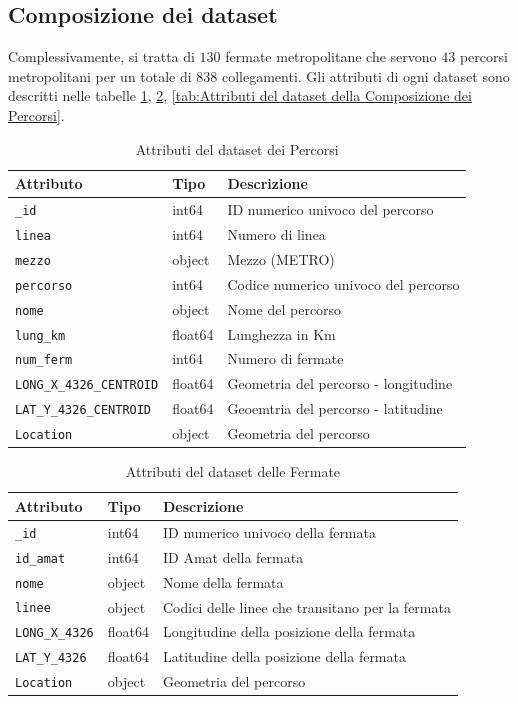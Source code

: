 \subsection{Composizione dei dataset}
Complessivamente, si tratta di $130$ fermate metropolitane che servono $43$ percorsi metropolitani per un totale di $838$ collegamenti. Gli attributi di ogni dataset sono descritti nelle tabelle \ref{tab:Attributi del dataset dei Percorsi}, \ref{tab:Attributi del dataset delle Fermate}, \ref{tab:Attributi del dataset della Composizione dei Percorsi}.

\begin{table}[!ht]
\centering
\begin{tabular}{lll}
\hline
\textbf{Attributo} & \textbf{Tipo} & \textbf{Descrizione} \\
\hline
\texttt{\_id} & int64 & ID numerico univoco del percorso \\
\texttt{linea} & int64 & Numero di linea \\
\texttt{mezzo} & object & Mezzo (METRO) \\
\texttt{percorso} & int64 & Codice numerico univoco del percorso \\
\texttt{nome} & object & Nome del percorso \\
\texttt{lung\_km} & float64 & Lunghezza in Km \\
\texttt{num\_ferm} & int64 & Numero di fermate \\
\texttt{LONG\_X\_4326\_CENTROID} & float64 & Geometria del percorso - longitudine \\
\texttt{LAT\_Y\_4326\_CENTROID} & float64 & Geoemtria del percorso - latitudine \\
\texttt{Location} & object & Geometria del percorso  \\
\hline
\end{tabular}
\caption{Attributi del dataset dei Percorsi}
\label{tab:Attributi del dataset dei Percorsi}
\end{table}

\begin{table}[ht!]
\centering
\begin{tabular}{lll}
\hline
\textbf{Attributo} & \textbf{Tipo} & \textbf{Descrizione} \\
\hline
\texttt{\_id} & int64 & ID numerico univoco della fermata \\
\texttt{id\_amat} & int64 & ID Amat della fermata \\
\texttt{nome} & object & Nome della fermata \\
\texttt{linee} & object & Codici delle linee che transitano per la fermata \\
\texttt{LONG\_X\_4326} & float64 & Longitudine della posizione della fermata \\
\texttt{LAT\_Y\_4326} & float64 & Latitudine della posizione della fermata \\
\texttt{Location} & object & Geometria del percorso  \\
\hline
\end{tabular}
\caption{Attributi del dataset delle Fermate}
\label{tab:Attributi del dataset delle Fermate}
\end{table}


